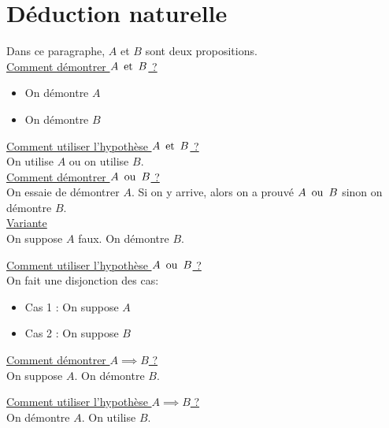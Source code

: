 \part{Déduction naturelle}
Dans ce paragraphe, $A$ et $B$ sont deux propositions.\\

\vspace{5mm}
\underline{Comment démontrer $A\operatorname{\text{ et }} B$ ?}
\begin{itemize}
	\item On démontre $A$ 
	\item On démontre $B$
\end{itemize}
\vspace{2mm}

\underline{Comment utiliser l'hypothèse $A \operatorname{\text{ et }} B$ ?}\\
On utilise $A$ ou on utilise $B$.\\

\vspace{5mm}
\underline{Comment démontrer $A\operatorname{\text{ ou }} B$ ?}\\
On essaie de démontrer $A$. Si on y arrive, alors on a prouvé $A\operatorname{\text{ ou }} B$ sinon on démontre $B$.\\

\underline{Variante}\\
On suppose $A$ faux. On démontre $B$.\\
\vspace{2mm}

\underline{Comment utiliser l'hypothèse $A \operatorname{\text{ ou }} B$ ?}\\
On fait une disjonction des cas:\\
\begin{itemize}
	\item {\sc Cas 1 : } On suppose $A$\\
	\item {\sc Cas 2 : } On suppose $B$\\
\end{itemize}

\vspace{5mm}
\underline{Comment démontrer $A\implies B$ ?} \\
On suppose $A$. On démontre $B$.\\
\vspace{2mm}

\underline{Comment utiliser l'hypothèse $A \implies B$ ?}\\
On démontre $A$. On utilise $B$.\\
